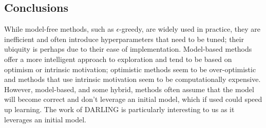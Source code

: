 \subsection{Conclusions}
While model-free methods, such as $\epsilon$-greedy, are widely used in practice, they are inefficient and often introduce hyperparameters that need to be tuned; their ubiquity is perhaps due to their ease of implementation. Model-based methods offer a more intelligent approach to exploration and tend to be based on optimism or intrinsic motivation; optimistic methods seem to be over-optimistic and methods that use intrinsic motivation seem to be computationally expensive. However, model-based, and some hybrid, methods often assume that the model will become correct and don't leverage an initial model, which if used could speed up learning. The work of DARLING is particularly interesting to us as it leverages an initial model.

